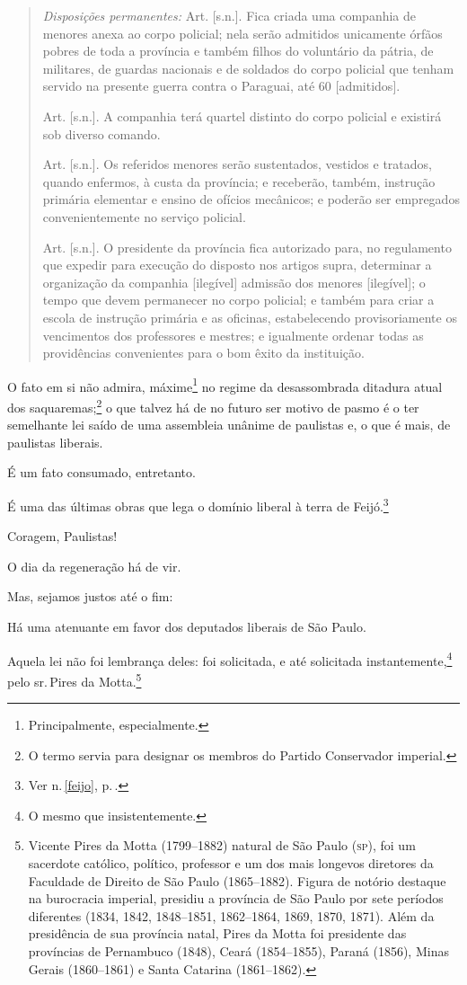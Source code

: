 \begin{quote}
\emph{Disposições permanentes:} Art. {[}s.n.{]}. Fica criada uma
companhia de menores anexa ao corpo policial; nela serão admitidos
unicamente órfãos pobres de toda a província e também filhos do
voluntário da pátria, de militares, de guardas nacionais e de soldados
do corpo policial que tenham servido na presente guerra contra o
Paraguai, até 60 {[}admitidos{]}.

Art. {[}s.n.{]}. A companhia terá quartel distinto do corpo policial e
existirá sob diverso comando.

Art. {[}s.n.{]}. Os referidos menores serão sustentados, vestidos e
tratados, quando enfermos, à custa da província; e receberão, também,
instrução primária elementar e ensino de ofícios mecânicos; e poderão
ser empregados convenientemente no serviço policial.

Art. {[}s.n.{]}. O presidente da província fica autorizado para, no
regulamento que expedir para execução do disposto nos artigos supra,
determinar a organização da companhia {[}ilegível{]} admissão dos
menores {[}ilegível{]}; o tempo que devem permanecer no corpo policial;
e também para criar a escola de instrução primária e as oficinas,
estabelecendo provisoriamente os vencimentos dos professores e mestres;
e igualmente ordenar todas as providências convenientes para o bom êxito
da instituição.
\end{quote}

O fato em si não admira, máxime\footnote{Principalmente,
  especialmente.} no regime da desassombrada ditadura atual dos
saquaremas;\footnote{O termo servia para designar os membros do Partido
  Conservador imperial.} o que talvez há de no futuro ser motivo de
pasmo é o ter semelhante lei saído de uma assembleia unânime de
paulistas e, o que é mais, de paulistas liberais.

É um fato consumado, entretanto.

É uma das últimas obras que lega o domínio liberal à terra de
Feijó.\footnote{Ver n.\,\ref{feijo}, p.\,\pageref{feijo}.}

Coragem, Paulistas!

O dia da regeneração há de vir.

\asterisc

Mas, sejamos justos até o fim:

Há uma atenuante em favor dos deputados liberais de São Paulo.

Aquela lei não foi lembrança deles: foi solicitada, e até solicitada
instantemente,\footnote{O mesmo que insistentemente.} pelo sr.\,Pires
da Motta.\footnote{Vicente Pires da Motta (1799--1882) natural de São
  Paulo (\textsc{sp}), foi um sacerdote católico, político, professor e um dos
  mais longevos diretores da Faculdade de Direito de São Paulo
  (1865--1882). Figura de notório destaque na burocracia imperial,
  presidiu a província de São Paulo por sete períodos diferentes (1834,
  1842, 1848--1851, 1862--1864, 1869, 1870, 1871). Além da presidência de
  sua província natal, Pires da Motta foi presidente das províncias de
  Pernambuco (1848), Ceará (1854--1855), Paraná (1856), Minas Gerais
  (1860--1861) e Santa Catarina (1861--1862).}

